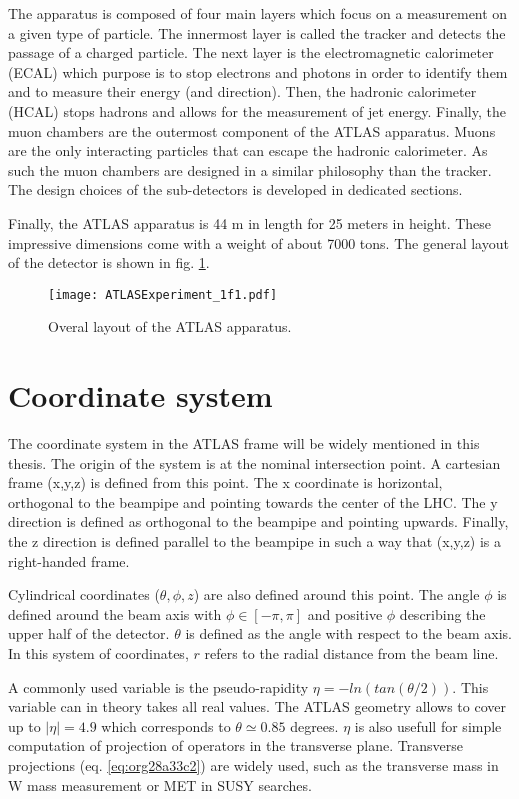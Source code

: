 The apparatus is composed of four main layers which focus on a measurement on a given type of particle.
The innermost layer is called the tracker and detects the passage of a charged particle.
The next layer is the electromagnetic calorimeter (ECAL) which purpose is to stop electrons and photons in order to identify them and to measure their energy (and direction).
Then, the hadronic calorimeter (HCAL) stops hadrons and allows for the measurement of jet energy.
Finally, the muon chambers are the outermost component of the ATLAS apparatus.
Muons are the only interacting particles that can escape the hadronic calorimeter.
As such the muon chambers are designed in a similar philosophy than the tracker.
The design choices of the sub-detectors is developed in dedicated sections.


Finally, the ATLAS apparatus is 44 m in length for 25 meters in height.
These impressive dimensions come with a weight of about 7000 tons.
The general layout of the detector is shown in fig. \ref{fig:org760cc96}.

\begin{figure}[htbp]
\centering
\texttt{[image: ATLASExperiment\_1f1.pdf]}
\caption{\label{fig:org760cc96}
Overal layout of the ATLAS apparatus.\cite{ATLASExperiment}}
\end{figure}

\section{Coordinate system}
\label{sec:orgfd01f9e}

The coordinate system in the ATLAS frame will be widely mentioned in this thesis.
The origin of the system is at the nominal intersection point.
A cartesian frame (x,y,z) is defined from this point.
The x coordinate is horizontal, orthogonal to the beampipe and pointing towards the center of the LHC.
The y direction is defined as orthogonal to the beampipe and pointing upwards.
Finally, the z direction is defined parallel to the beampipe in such a way that (x,y,z) is a right-handed frame.

Cylindrical coordinates ($\theta,\phi,z$) are also defined around this point.
The  angle $\phi$ is defined around the beam axis with $\phi\in[-\pi, \pi]$ and positive $\phi$ describing the upper half of the detector.
$\theta$ is defined as the angle with respect to the beam axis.
In this system of coordinates, $r$ refers to the radial distance from the beam line.

A commonly used variable is the pseudo-rapidity $\eta=-ln(tan(\theta/2))$.
This variable can in theory takes all real values.
The ATLAS geometry allows to cover up to $|\eta|=4.9$ which corresponds to $\theta\simeq 0.85$ degrees.
$\eta$ is also usefull for simple computation of projection of operators in the transverse plane.
Transverse projections (eq. \ref{eq:org28a33c2}) are widely used, such as the transverse mass in W mass measurement or MET in SUSY searches.

